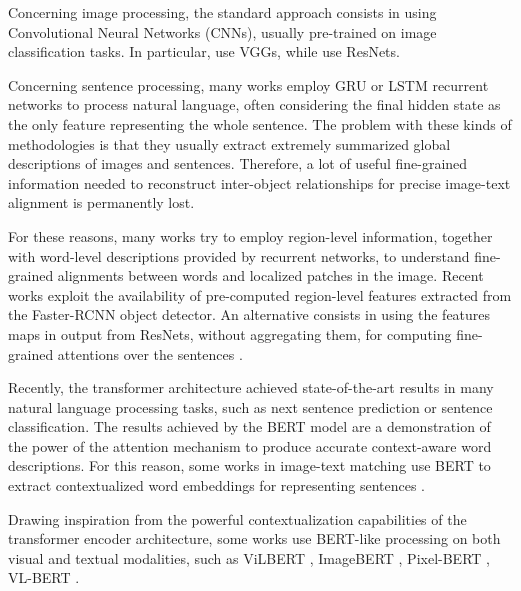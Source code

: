 \documentclass[acmsmall]{acmart}
\newif\ifdraft
\newcommand{\majorrevised}[1]{#1}
\newcommand{\revised}[1]{\ifdraft{\leavevmode\color{blue}{#1}}\else{#1}\fi}
\begin{document}
Concerning image processing, the standard approach consists in using Convolutional Neural Networks (CNNs), usually pre-trained on image classification tasks. In particular, \cite{KleinLSW15fishervectors,VendrovKFU15,LinP16,HuangWW17,EisenschtatW17} use VGGs, while \cite{LiuGBL17,vsepp2018faghri,GuCJN018,Huang2018} use ResNets. 
\majorrevised{
Concerning sentence processing, many works \cite{karpathy2015alignment,vsepp2018faghri,li2019,lee2018stackedcrossattention,Huang2018} employ GRU or LSTM recurrent networks to process natural language, often considering the final hidden state as the only feature representing the whole sentence.
The problem with these kinds of methodologies is that they usually extract extremely summarized global descriptions of images and sentences.
Therefore, a lot of useful fine-grained information needed to reconstruct inter-object relationships for precise image-text alignment is permanently lost.

For these reasons, many works try to employ region-level information, together with word-level descriptions provided by recurrent networks, to understand fine-grained alignments between words and localized patches in the image.
Recent works \cite{huang2018bi,liu2019focus,liu2020graph,huang2019acmm,wang2019position,Chen2020imram,lee2018stackedcrossattention} exploit the availability of pre-computed region-level features extracted from the Faster-RCNN \cite{RenHGS15fasterrcnn} object detector. An alternative consists in using the features maps in output from ResNets, without aggregating them, for computing fine-grained attentions over the sentences \cite{xu2020cross,huang2018image,wang2018joint,wei2020adversarial,guo2020associating,ji2020sman}.



Recently, the transformer architecture \cite{vaswani2017transformer} achieved state-of-the-art results in many natural language processing tasks, such as next sentence prediction or sentence classification. The results achieved by the BERT model \cite{devlin2019bert} are a demonstration of the power of the attention mechanism to produce accurate context-aware word descriptions.
For this reason, some works in image-text matching use BERT to extract contextualized word embeddings for representing sentences \cite{wu2019learning,sarafianos2019adversarial,qu2020context,wei2020multi}. \revised{Drawing inspiration from the powerful contextualization capabilities of the transformer encoder architecture, some works use BERT-like processing on both visual and textual modalities, such as ViLBERT \cite{lu2019vilbert}, ImageBERT \cite{qi2020imagebert}, Pixel-BERT \cite{huang2020pixelbert}, VL-BERT \cite{Su2020VL-BERT}. 


}}
\end{document}
